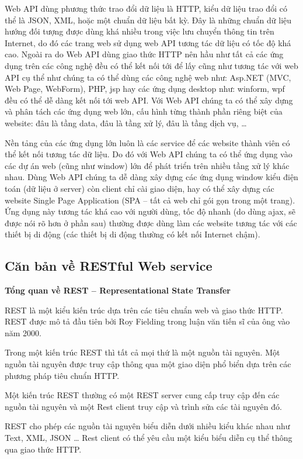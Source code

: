 Web API dùng phương thức trao đổi dữ liệu là HTTP, kiểu dữ liệu trao đổi có thể là JSON, XML, hoặc một chuẩn dữ liệu bất kỳ. Đây là những chuẩn dữ liệu hướng đối tượng được dùng khá nhiều trong việc lưu chuyển thông tin trên Internet, do đó các trang web sử dụng web API tương tác dữ liệu có tốc độ khá cao. Ngoài ra do Web API dùng giao thức HTTP nên hầu như tất cả các ứng dụng trên các công nghệ đều có thể kết nối tới để lấy cũng như tương tác với web API cụ thể như chúng ta có thể dùng các công nghệ web như: Asp.NET (MVC, Web Page, WebForm), PHP, jsp hay các ứng dụng desktop như: winform, wpf đều có thể dễ dàng kết nối tới web API. Với Web API chúng ta có thể xây dựng và phân tách các ứng dụng web lớn, cấu hình từng thành phần riêng biệt của website: đâu là tầng data, đâu là tầng xử lý, đâu là tầng dịch vụ, … 

Nền tảng của các ứng dụng lớn luôn là các service để các website thành viên có thể kết nối tương tác dữ liệu. Do đó với Web API chúng ta có thể ứng dụng vào các dự án web (cũng như window) lớn để phát triển trên nhiều tầng xử lý khác nhau. Dùng Web API chúng ta dễ dàng xây dựng các ứng dụng window kiểu điện toán (dữ liệu ở server) còn client chỉ cài giao diện, hay có thể xây dựng các website Single Page Application (SPA – tất cả web chỉ gói gọn trong một trang). Ứng dụng này tương tác khá cao với người dùng, tốc độ nhanh (do dùng ajax, sẽ được nói rõ hơn ở phần sau) thường được dùng làm các website tương tác với các thiết bị di động (các thiết bị di động thường có kết nối Internet chậm).

\subsection{Căn bản về RESTful Web service}

\textbf{Tổng quan về REST – Representational State Transfer}

REST là một kiểu kiến trúc dựa trên các tiêu chuẩn web và giao thức HTTP. REST được mô tả đầu tiên bởi Roy Fielding trong luận văn tiến sĩ của ông vào năm 2000.

Trong một kiến trúc REST thì tất cả mọi thứ là một nguồn tài nguyên. Một nguồn tài nguyên được truy cập thông qua một giao diện phổ biển dựa trên các phương pháp tiêu chuẩn HTTP.

Một kiến trúc REST thường có một REST server cung cấp truy cập đến các nguồn tài nguyên và một Rest client truy cập và trình sửa các tài nguyên đó.

REST cho phép các nguồn tài nguyên biểu diễn dưới nhiều kiểu khác nhau như Text, XML, JSON … Rest client có thể yêu cầu một kiểu biểu diễn cụ thể thông qua giao thức HTTP.

